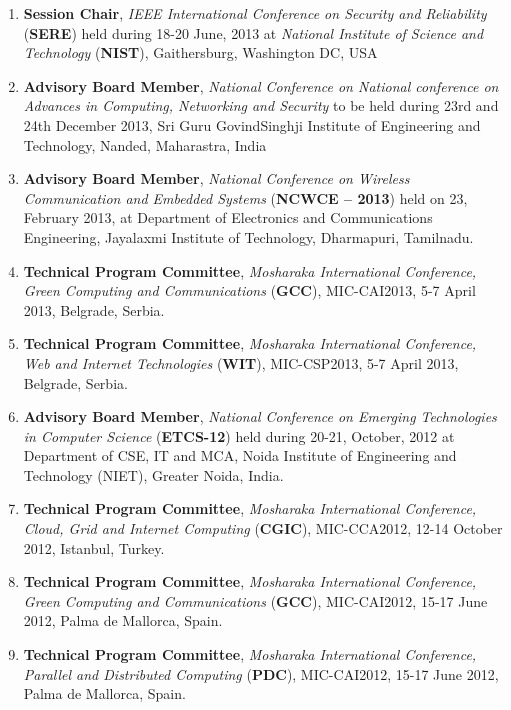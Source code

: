\begin{enumerate} [label=(\arabic*).]
\item
\textbf{Session Chair}, \textit{IEEE International Conference on Security and Reliability} (\textbf{SERE}) held during 18-20 June, 2013 at\textit{ National Institute of Science and Technology} (\textbf{NIST}), Gaithersburg, Washington DC, USA

\item
\textbf{Advisory Board Member}, \textit{National Conference on National conference on Advances in Computing, Networking and Security} to be held during 23rd and 24th December 2013, Sri Guru GovindSinghji Institute of Engineering and Technology, Nanded, Maharastra, India

\item
\textbf{Advisory Board Member}, \textit{National Conference on Wireless Communication and Embedded Systems} (\textbf{NCWCE – 2013}) held on 23, February 2013, at Department of Electronics and Communications Engineering, Jayalaxmi Institute of Technology, Dharmapuri, Tamilnadu. 

\item
\textbf{Technical Program Committee}, \textit{Mosharaka International Conference, Green Computing and Communications} (\textbf{GCC}), MIC-CAI2013, 5-7 April 2013, Belgrade, Serbia.

\item
\textbf{Technical Program Committee}, \textit{Mosharaka International Conference, Web and Internet Technologies} (\textbf{WIT}), MIC-CSP2013, 5-7 April 2013, Belgrade, Serbia.

\item
\textbf{Advisory Board Member}, \textit{National Conference on Emerging Technologies in Computer Science}  (\textbf{ETCS-12})  held during 20-21, October, 2012 at Department of CSE, IT and MCA, Noida Institute of Engineering and Technology (NIET), Greater Noida, India.

\item
\textbf{Technical Program Committee}, \textit{Mosharaka International Conference, Cloud, Grid and Internet Computing} (\textbf{CGIC}), MIC-CCA2012, 12-14 October 2012, Istanbul, Turkey.

\item
\textbf{Technical Program Committee}, \textit{Mosharaka International Conference, Green Computing and Communications} (\textbf{GCC}), MIC-CAI2012, 15-17 June 2012, Palma de Mallorca, Spain.

\item
\textbf{Technical Program Committee},\textit{ Mosharaka International Conference, Parallel and Distributed Computing} (\textbf{PDC}), MIC-CAI2012, 15-17 June 2012, Palma de Mallorca, Spain.


\end{enumerate}
